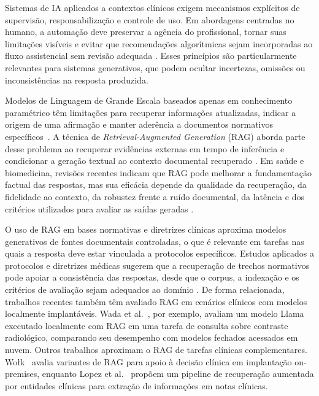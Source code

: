 
Sistemas de IA aplicados a contextos clínicos exigem mecanismos explícitos de supervisão, responsabilização e controle de uso. Em abordagens centradas no humano, a automação deve preservar a agência do profissional, tornar suas limitações visíveis e evitar que recomendações algorítmicas sejam incorporadas ao fluxo assistencial sem revisão adequada \cite{Shneiderman2021, Cabitza2022}. Esses princípios são particularmente relevantes para sistemas generativos, que podem ocultar incertezas, omissões ou inconsistências na resposta produzida.

Modelos de Linguagem de Grande Escala baseados apenas em conhecimento paramétrico têm limitações para recuperar informações atualizadas, indicar a origem de uma afirmação e manter aderência a documentos normativos específicos~\cite{mallen2023not}. A técnica de \textit{Retrieval-Augmented Generation} (RAG) aborda parte desse problema ao recuperar evidências externas em tempo de inferência e condicionar a geração textual ao contexto documental recuperado \cite{Lewis2020RAG}. Em saúde e biomedicina, revisões recentes indicam que RAG pode melhorar a fundamentação factual das respostas, mas sua eficácia depende da qualidade da recuperação, da fidelidade ao contexto, da robustez frente a ruído documental, da latência e dos critérios utilizados para avaliar as saídas geradas \cite{amugongo2025retrieval, Sharma2025RAGSurvey}.

O uso de RAG em bases normativas e diretrizes clínicas aproxima modelos generativos de fontes documentais controladas, o que é relevante em tarefas nas quais a resposta deve estar vinculada a protocolos específicos. Estudos aplicados a protocolos e diretrizes médicas sugerem que a recuperação de trechos normativos pode apoiar a consistência das respostas, desde que o corpus, a indexação e os critérios de avaliação sejam adequados ao domínio \cite{ke2025retrieval}. De forma relacionada, trabalhos recentes também têm avaliado RAG em cenários clínicos com modelos localmente implantáveis. Wada et al.~\cite{wada2025radiology}, por exemplo, avaliam um modelo Llama executado localmente com RAG em uma tarefa de consulta sobre contraste radiológico, comparando seu desempenho com modelos fechados acessados em nuvem. Outros trabalhos aproximam o RAG de tarefas clínicas complementares. Wo{\l}k~\cite{wolk2025evaluating} avalia variantes de RAG para apoio à decisão clínica em implantação on-premises, enquanto Lopez et al.~\cite{lopez2025clinical} propõem um pipeline de recuperação aumentada por entidades clínicas para extração de informações em notas clínicas.


